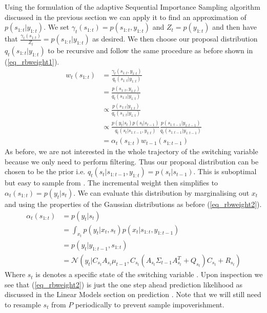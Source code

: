 \documentclass[../masters.tex]{subfiles}
\begin{document}
Using the formulation of the adaptive Sequential Importance Sampling algorithm discussed in the previous section we can apply it to find an approximation of $p(s_{1:t}|y_{1:t})$. We set $\gamma_t(s_{1:t})=p(s_{1:t},y_{1:t})$ and $Z_t=p(y_{1:t})$ and then have that $\frac{\gamma_t(s_{1:t})}{Z_t} = p(s_{1:t}|y_{1:t})$ as desired. We then choose our proposal distribution $q_t(s_{1:t}|y_{1:t})$ to be recursive and follow the same procedure as before shown in (\ref{eq_rbweight1}).
\begin{equation}
\begin{aligned}
w_t(s_{1:t}) &= \frac{\gamma_t(s_{1:t},y_{1:t})}{q_t(s_{1:t}|y_{1:t})} \\
&= \frac{p(s_{1:t},y_{1:t})}{q_t(s_{1:t}|y_{1:t})} \\
&\propto \frac{p(s_{1:t}|y_{1:t})}{q_t(s_{1:t}|y_{1:t})} \\
&\propto \frac{p(y_t|s_t)p(s_t|s_{t-1})}{q_t(s_t|s_{1:t-1},y_{1:t})}\frac{p(s_{1:t-1}|y_{1:t-1})}{q_t(s_{1:t-1}|y_{1:t-1})} \\
&= \alpha_t(s_{1:t})w_{t-1}(s_{1:t-1})
\end{aligned}
\label{eq_rbweight1}
\end{equation}
As before, we are not interested in the whole trajectory of the switching variable because we only need to perform filtering. Thus our proposal distribution can be chosen to be the prior i.e. $q_t(s_t|s_{1:t-1},y_{1:t}) = p(s_t|s_{t-1})$. This is suboptimal but easy to sample from \cite{doucet}. The incremental weight then simplifies to $\alpha_t(s_{1:t}) = p(y_t|s_t)$. We can evaluate this distribution by marginalising out $x_t$ and using the properties of the Gaussian distributions as before (\ref{eq_rbweight2}).
\begin{equation}
\begin{aligned}
\alpha_t(s_{1:t}) &= p(y_t|s_t) \\
&= \int_{x_t} p(y_t|x_t,s_t)p(x_t|s_{1:t},y_{1:t-1}) \\
&= p(y_t|y_{1:t-1}, s_{1:t}) \\
&= \mathcal{N}\left(y_t | C_{s_t}A_{s_t}\mu_{t-1}, C_{s_t}\left(A_{s_t}\Sigma_{t-1}A_{s_t}^T+Q_{s_t} \right)C_{s_t} + R_{s_t} \right)
\end{aligned}
\label{eq_rbweight2}
\end{equation} 
Where $s_t$ is denotes a specific state of the switching variable \cite{murphy1}. Upon inspection we see that (\ref{eq_rbweight2}) is just the one step ahead prediction likelihood as discussed in the Linear Models section on prediction \cite{murphy1}. Note that we will still need to resample $s_t$ from $P$ periodically to prevent sample impoverishment. 
\end{document}
